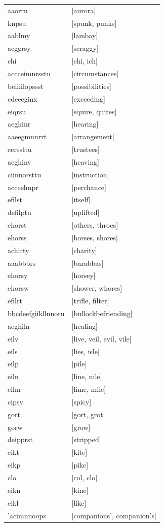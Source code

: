 \documentclass{article}
\begin{document}
\begin{tabular}{ll}
aaorru & [aurora] \\
knpsu & [spunk, punks] \\
aablmy & [lambay] \\
acggrsy & [scraggy] \\
chi & [chi, ich] \\
accceimnrsstu & [circumstances] \\
beiiiilopssst & [possibilities] \\
cdeeeginx & [exceeding] \\
eiqrsu & [squire, quires] \\
aeghinr & [hearing] \\
aaeegmnnrrt & [arrangement] \\
eerssttu & [trustees] \\
aeghinv & [heaving] \\
ciinnorsttu & [instruction] \\
acceehnpr & [perchance] \\
efilst & [itself] \\
defilptu & [uplifted] \\
ehorst & [others, throes] \\
ehorss & [horses, shores] \\
achirty & [charity] \\
aaabbbrs & [barabbas] \\
ehorsy & [horsey] \\
ehorsw & [shower, whores] \\
efilrt & [trifle, filter] \\
bbcdeefgiikllnnoru & [bullockbefriending] \\
aeghiln & [healing] \\
eilv & [live, veil, evil, vile] \\
eils & [lies, isle] \\
eilp & [pile] \\
eiln & [line, nile] \\
eilm & [lime, mile] \\
cipsy & [spicy] \\
gort & [gort, grot] \\
gorw & [grow] \\
deipprst & [stripped] \\
eikt & [kite] \\
eikp & [pike] \\
clo & [col, clo] \\
eikn & [kine] \\
eikl & [like] \\
'acimnnoops & [companions', companion's] \\

\end{tabular}
\end{document}

